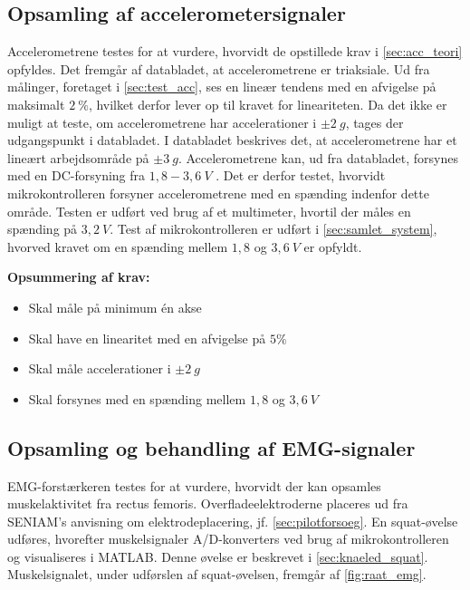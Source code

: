 \subsection{Opsamling af accelerometersignaler}

Accelerometrene testes for at vurdere, hvorvidt de opstillede krav i \autoref{sec:acc_teori} opfyldes. 
Det fremgår af databladet, at accelerometrene er triaksiale.  
Ud fra målinger, foretaget i \autoref{sec:test_acc}, ses en lineær tendens med en afvigelse på maksimalt $2~\%$, hvilket derfor lever op til kravet for lineariteten. 
Da det ikke er muligt at teste, om accelerometrene har accelerationer i $\pm2~g$, tages der udgangspunkt i databladet. 
I databladet beskrives det, at accelerometrene har et lineært arbejdsområde på $\pm 3~g$.
Accelerometrene kan, ud fra databladet, forsynes med en DC-forsyning fra $1,8-3,6~V$ \citep{analogdevices2009}.  
Det er derfor testet, hvorvidt mikrokontrolleren forsyner accelerometrene med en spænding indenfor dette område. 
Testen er udført ved brug af et multimeter, hvortil der måles en spænding på $3,2~V$. 
Test af mikrokontrolleren er udført i \autoref{sec:samlet_system}, hvorved kravet om en spænding mellem $1,8$ og $3,6~V$ er opfyldt.

\vspace{3mm}
\textbf{Opsummering af krav:}
\begin{itemize}
\item[\text{\sffamily \checkmark}] Skal måle på minimum én akse
\item[\text{\sffamily \checkmark}] Skal have en linearitet med en afvigelse på $5\%$
\item[\text{\sffamily \checkmark}] Skal måle accelerationer i $\pm2~g$
\item[\text{\sffamily \checkmark}] Skal forsynes med en spænding mellem $1,8$ og $3,6~V$
\end{itemize}


\subsection{Opsamling og behandling af EMG-signaler}

EMG-forstærkeren testes for at vurdere, hvorvidt der kan opsamles muskelaktivitet fra rectus femoris. 
Overfladeelektroderne placeres ud fra SENIAM's anvisning om elektrodeplacering, jf. \autoref{sec:pilotforsoeg}. 
En squat-øvelse udføres, hvorefter muskelsignaler A/D-konverters ved brug af mikrokontrolleren og visualiseres i MATLAB. 
Denne øvelse er beskrevet i \autoref{sec:knaeled_squat}. 
Muskelsignalet, under udførslen af squat-øvelsen, fremgår af \autoref{fig:raat_emg}. 

